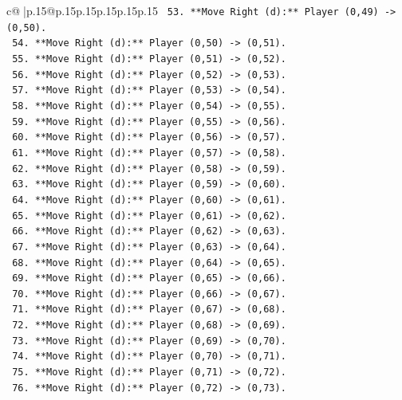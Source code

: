 \documentclass{article}
\begin{document}
{\begin{supertabular}{c@{$\;$}|p{.15\linewidth}@{}p{.15\linewidth}p{.15\linewidth}p{.15\linewidth}p{.15\linewidth}p{.15\linewidth}}
{{{\texttt{        53. **Move Right (d):** Player (0,49) {-}> (0,50).} \\
\texttt{        54. **Move Right (d):** Player (0,50) {-}> (0,51).} \\
\texttt{        55. **Move Right (d):** Player (0,51) {-}> (0,52).} \\
\texttt{        56. **Move Right (d):** Player (0,52) {-}> (0,53).} \\
\texttt{        57. **Move Right (d):** Player (0,53) {-}> (0,54).} \\
\texttt{        58. **Move Right (d):** Player (0,54) {-}> (0,55).} \\
\texttt{        59. **Move Right (d):** Player (0,55) {-}> (0,56).} \\
\texttt{        60. **Move Right (d):** Player (0,56) {-}> (0,57).} \\
\texttt{        61. **Move Right (d):** Player (0,57) {-}> (0,58).} \\
\texttt{        62. **Move Right (d):** Player (0,58) {-}> (0,59).} \\
\texttt{        63. **Move Right (d):** Player (0,59) {-}> (0,60).} \\
\texttt{        64. **Move Right (d):** Player (0,60) {-}> (0,61).} \\
\texttt{        65. **Move Right (d):** Player (0,61) {-}> (0,62).} \\
\texttt{        66. **Move Right (d):** Player (0,62) {-}> (0,63).} \\
\texttt{        67. **Move Right (d):** Player (0,63) {-}> (0,64).} \\
\texttt{        68. **Move Right (d):** Player (0,64) {-}> (0,65).} \\
\texttt{        69. **Move Right (d):** Player (0,65) {-}> (0,66).} \\
\texttt{        70. **Move Right (d):** Player (0,66) {-}> (0,67).} \\
\texttt{        71. **Move Right (d):** Player (0,67) {-}> (0,68).} \\
\texttt{        72. **Move Right (d):** Player (0,68) {-}> (0,69).} \\
\texttt{        73. **Move Right (d):** Player (0,69) {-}> (0,70).} \\
\texttt{        74. **Move Right (d):** Player (0,70) {-}> (0,71).} \\
\texttt{        75. **Move Right (d):** Player (0,71) {-}> (0,72).} \\
\texttt{        76. **Move Right (d):** Player (0,72) {-}> (0,73).} \\
}}}
\end{supertabular}}
\end{document}
